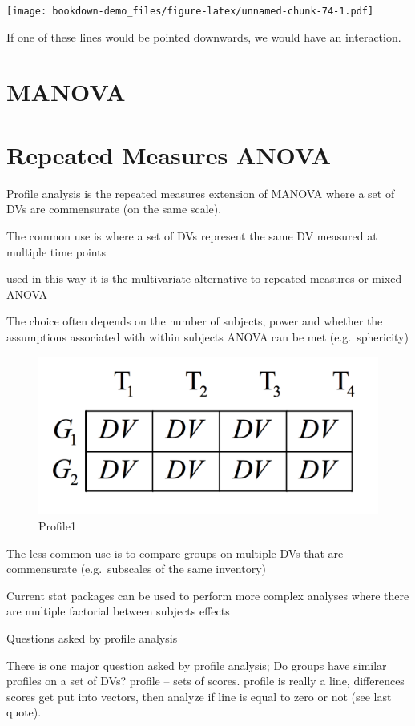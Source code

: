 \documentclass[]{book}
\theoremstyle{definition}
\theoremstyle{definition}
\theoremstyle{definition}
\theoremstyle{remark}
\begin{document}
\texttt{[image: bookdown-demo\_files/figure-latex/unnamed-chunk-74-1.pdf]}

If one of these lines would be pointed downwards, we would have an
interaction.

\chapter{MANOVA}\label{manova}

\chapter{Repeated Measures ANOVA}\label{repeated-measures-anova-1}

Profile analysis is the repeated measures extension of MANOVA where a
set of DVs are commensurate (on the same scale).

The common use is where a set of DVs represent the same DV measured at
multiple time points

used in this way it is the multivariate alternative to repeated measures
or mixed ANOVA

The choice often depends on the number of subjects, power and whether
the assumptions associated with within subjects ANOVA can be met
(e.g.~sphericity)

\begin{figure}
\centering
\includegraphics{img/jhprofile1.png}
\caption{Profile1}
\end{figure}

The less common use is to compare groups on multiple DVs that are
commensurate (e.g.~subscales of the same inventory)

Current stat packages can be used to perform more complex analyses where
there are multiple factorial between subjects effects

Questions asked by profile analysis

There is one major question asked by profile analysis; Do groups have
similar profiles on a set of DVs? profile -- sets of scores. profile is
really a line, differences scores get put into vectors, then analyze if
line is equal to zero or not (see last quote).
\end{document}

